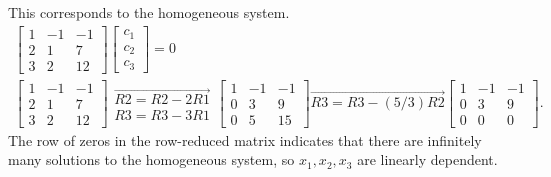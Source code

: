 \documentclass[../main.tex]{subfiles}
\begin{document}
\begin{example}
This corresponds to the homogeneous system.
$$
\begin{gathered}
{\left[\begin{array}{ccc}
	1 & -1 & -1 \\
	2 & 1 & 7 \\
	3 & 2 & 12
	\end{array}\right]\left[\begin{array}{l}
	c_{1} \\
	c_{2} \\
	c_{3}
	\end{array}\right]=0} \\
{\left[\begin{array}{ccc}
	1 & -1 & -1 \\
	2 & 1 & 7 \\
	3 & 2 & 12
	\end{array}\right] \begin{array}{l}
	\overrightarrow{R 2=R 2-2 R 1} \\ R 3=R 3-3 R 1
	\end{array}\left[\begin{array}{ccc}
	1 & -1 & -1 \\
	0 & 3 & 9 \\
	0 & 5 & 15
	\end{array}\right] \overrightarrow{R 3=R 3-(5 / 3) R 2}\left[\begin{array}{ccc}
	1 & -1 & -1 \\
	0 & 3 & 9 \\
	0 & 0 & 0
	\end{array}\right] .}
\end{gathered}
$$
The row of zeros in the row-reduced matrix indicates that there are infinitely many solutions to the homogeneous system, so $x_{1}, x_{2}, x_{3}$ are linearly dependent.
\end{example}
\end{document}
